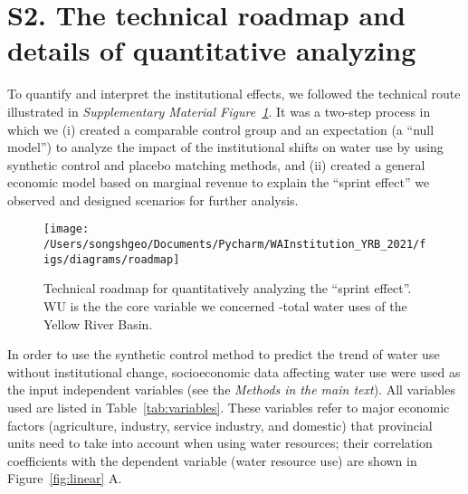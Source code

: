 \documentclass{article}
\begin{document}
\section*{S2. The technical roadmap and details of quantitative analyzing}

To quantify and interpret the institutional effects, we followed the technical route illustrated in \textit{Supplementary Material Figure~\ref{fig:roadmap}}. It was a two-step process in which we
(i) created a comparable control group and an expectation (a “null model”) to analyze the impact of the institutional shifts on water use by using synthetic control and placebo matching methods, and
(ii) created a general economic model based on marginal revenue to explain the “sprint effect” we observed and designed scenarios for further analysis.

\begin{figure}[!hbt]
    \centering
    \texttt{[image: /Users/songshgeo/Documents/Pycharm/WAInstitution\_YRB\_2021/figs/diagrams/roadmap]}
    \caption{
        Technical roadmap for quantitatively analyzing the “sprint effect”. WU is the the core variable we concerned -total water uses of the Yellow River Basin.
    }
    \label{fig:roadmap}
\end{figure}

In order to use the synthetic control method to predict the trend of water use without institutional change, socioeconomic data affecting water use were used as the input independent variables (see the \textit{Methods in the main text}). All variables used are listed in Table~\ref{tab:variables}.
These variables refer to major economic factors (agriculture, industry, service industry, and domestic) that provincial units need to take into account when using water resources; their correlation coefficients with the dependent variable (water resource use) are shown in Figure~\ref{fig:linear} A.
\end{document}
